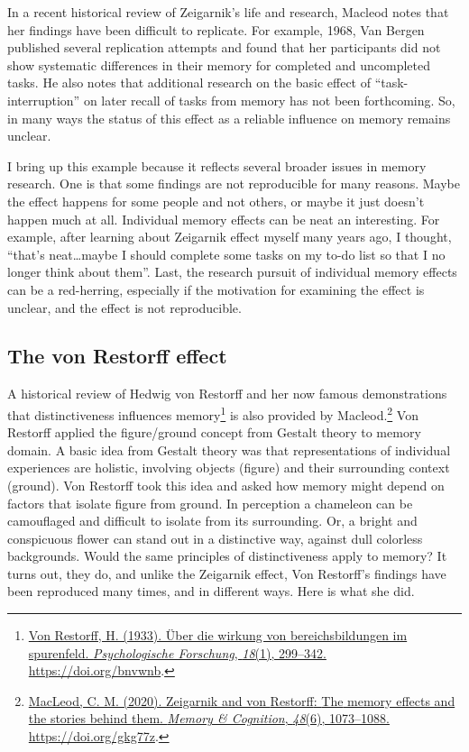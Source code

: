 \documentclass[
  oneside,
  12pt]{crumpbook}
\begin{document}
In a recent historical review of Zeigarnik's life and research, Macleod notes that her findings have been difficult to replicate. For example, 1968, Van Bergen published several replication attempts and found that her participants did not show systematic differences in their memory for completed and uncompleted tasks. He also notes that additional research on the basic effect of ``task-interruption'' on later recall of tasks from memory has not been forthcoming. So, in many ways the status of this effect as a reliable influence on memory remains unclear.

I bring up this example because it reflects several broader issues in memory research. One is that some findings are not reproducible for many reasons. Maybe the effect happens for some people and not others, or maybe it just doesn't happen much at all. Individual memory effects can be neat an interesting. For example, after learning about Zeigarnik effect myself many years ago, I thought, ``that's neat\ldots maybe I should complete some tasks on my to-do list so that I no longer think about them''. Last, the research pursuit of individual memory effects can be a red-herring, especially if the motivation for examining the effect is unclear, and the effect is not reproducible.

\hypertarget{the-von-restorff-effect}{%
\subsection{The von Restorff effect}\label{the-von-restorff-effect}}

A historical review of Hedwig von Restorff and her now famous demonstrations that distinctiveness influences memory\footnote{\protect\hyperlink{ref-vonrestorffUberWirkungBereichsbildungen1933}{Von Restorff, H. (1933). Über die wirkung von bereichsbildungen im spurenfeld. \emph{Psychologische Forschung}, \emph{18}(1), 299--342. \url{https://doi.org/bnvwnb}}.} is also provided by Macleod.\footnote{\protect\hyperlink{ref-macleodZeigarnikRestorffMemory2020}{MacLeod, C. M. (2020). Zeigarnik and von {Restorff}: {The} memory effects and the stories behind them. \emph{Memory \& Cognition}, \emph{48}(6), 1073--1088. \url{https://doi.org/gkg77z}}.} Von Restorff applied the figure/ground concept from Gestalt theory to memory domain. A basic idea from Gestalt theory was that representations of individual experiences are holistic, involving objects (figure) and their surrounding context (ground). Von Restorff took this idea and asked how memory might depend on factors that isolate figure from ground. In perception a chameleon can be camouflaged and difficult to isolate from its surrounding. Or, a bright and conspicuous flower can stand out in a distinctive way, against dull colorless backgrounds. Would the same principles of distinctiveness apply to memory? It turns out, they do, and unlike the Zeigarnik effect, Von Restorff's findings have been reproduced many times, and in different ways. Here is what she did.
\end{document}
